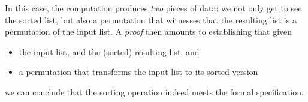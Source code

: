 \documentclass{llncs}
\begin{document}
In this case, the computation produces \emph{two} pieces of data: we
not only get to see the sorted list, but also a permutation that
witnesses that the resulting list is a permutation of the input
list. 
%
A \emph{proof}  then amounts to establishing that given
\begin{itemize}
\item the input list, and the (sorted) resulting list, and
\item a permutation that transforms the input list to its sorted
version
\end{itemize}
we can conclude that the sorting operation indeed meets the formal
specification. 


%
%
\end{document}
